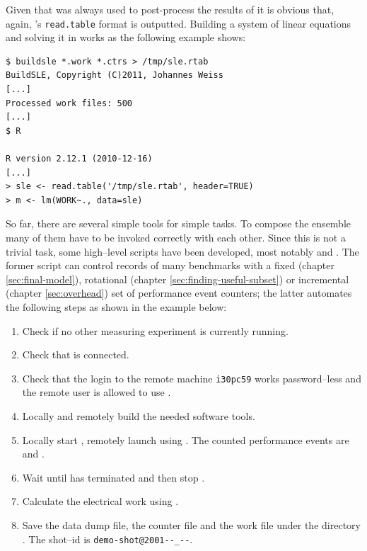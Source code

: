 Given that \JWTR{} was always used to post-process the results of \JWTbsle{}
it is obvious that, again, \JWTR's \texttt{read.table} \cite{r11data} format is
outputted. Building a system of linear equations and solving it in \JWTR{}
works as the following example shows:

\begin{lstlisting}[style=Shell]
$ buildsle *.work *.ctrs > /tmp/sle.rtab
BuildSLE, Copyright (C)2011, Johannes Weiss
[...]
Processed work files: 500
[...]
$ R

R version 2.12.1 (2010-12-16)
[...]
> sle <- read.table('/tmp/sle.rtab', header=TRUE)
> m <- lm(WORK~., data=sle)
\end{lstlisting}



So far, there are several simple tools for simple tasks. To compose the ensemble
many of them have to be invoked correctly with each other. Since this is not a
trivial task, some high--level scripts have been developed, most notably
 and \JWTdomeasuring{}.  The
former script can control records of many benchmarks with a fixed (chapter
\ref{sec:final-model}), rotational (chapter \ref{sec:finding-useful-subset}) or
incremental (chapter \ref{sec:overhead}) set of performance event counters; the
latter automates the following steps as shown in the example below:

\begin{enumerate}

\item Check if no other measuring experiment is currently running.

\item Check that \JWPni{} is connected.

\item Check that the login to the remote machine \texttt{i30pc59} works
password--less and the remote user is allowed to use .

\item Locally and remotely build the needed software tools.

\item Locally start \JWTdd{}, remotely launch  using \JWTdc{}.
The counted performance events are \JWctrCLK{} and \JWctrINST{}.

\item Wait until  has terminated and then stop \JWTdd{}.

\item Calculate the electrical work using \JWTfcw{}.

\item Save the data dump file, the counter file and the work file under the
directory . The shot--id is
\texttt{demo-\-shot\-@2001--\_--}.

\end{enumerate}

